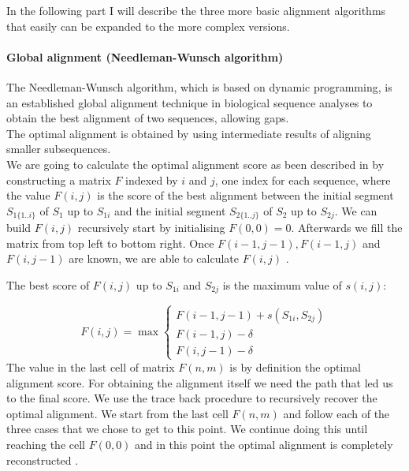 \documentclass[11pt,a4paper]{report}
\begin{document}
In the following part I will describe the three more basic alignment 
algorithms that easily can be expanded to the more complex versions.






\paragraph{ Global alignment (Needleman-Wunsch algorithm) }


The Needleman-Wunsch algorithm, which is based on dynamic programming, 
is an established global alignment technique in biological 
sequence analyses to obtain the best alignment of two sequences, 
allowing  gaps.\\
The optimal alignment is obtained by using intermediate results of
aligning smaller subsequences\cite{durbin}.\\
We are going to calculate the optimal alignment score as been described 
in \cite{durbin} by constructing a matrix $F$ indexed
by $i$ and $j$, one index for each sequence, where the value $F(i, j)$ is the score
of the best alignment between the initial segment $S_{1\{1..i\}}$ of $S_{1}$ 
up to $S_{1i}$ and the initial segment $S_{2\{1..j\}}$ of $S_{2}$  up to 
$S_{2j}$. We can build $F(i, j)$ recursively start by initialising 
$F(0, 0) = 0$. Afterwards we fill the matrix from top left to 
bottom right. 
Once $ F(i-1, j-1 ), F(i-1 , j) $ and $ F(i , j-1) $ are known, we 
are able to calculate $ F(i, j)$ \cite{durbin}.

The best score of $F(i,j)$ up to $S_{1i}$ and $S_{2j}$ is the maximum 
value of $s(i,j)$:

\[ F(i,j)= \max
\begin{cases}
   F(i-1,j-1) + s(S_{1i} , S_{2j})\\
   F(i-1 , j)- \delta\\
   F(i,j-1)- \delta
\end{cases}
\]
The value in the last cell of matrix $F(n,m)$ is by definition the optimal 
alignment score. 
For obtaining the alignment itself we need the path that led us to the 
final score. We use the trace back procedure to recursively recover the 
optimal alignment\cite{durbin}\cite{eddydynamic}.
We start from the last cell $F(n,m)$ and follow each of the three cases 
that we chose to get to this point. We continue doing this until reaching
the cell $F(0,0)$ and in this point the optimal alignment is completely 
reconstructed \cite{eddydynamic}.
\end{document}
